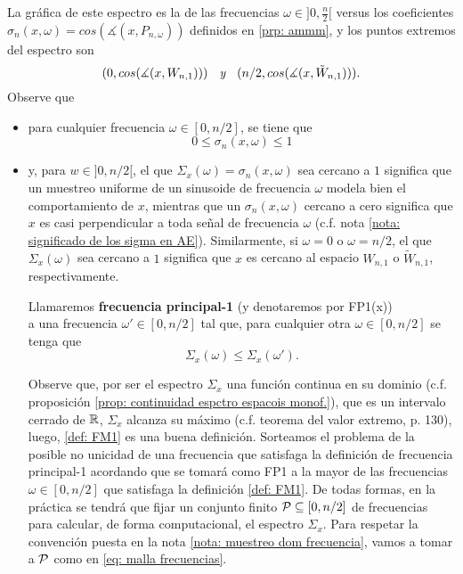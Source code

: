 \begin{itemize}
	La gráfica de este espectro es la de 
	las frecuencias $\omega \in ]0, \frac{n}{2}[$ versus	
	los coeficientes
	$\sigma_{n}(x, \omega) = cos(\measuredangle(x, P_{n, \omega}))$ definidos en 
	\ref{prp: ammm}, y 
	los puntos extremos del espectro son
	\[
	(0, cos(\measuredangle(x, W_{n,1})))
	\hspace{0.2cm} \textit{ y } \hspace{0.2cm}
	(n/2, cos(\measuredangle(x, \tilde{W}_{n,1}))).
	\]	
	Observe que
	\begin{itemize}
		\item para cualquier frecuencia $\omega \in [0, n/2]$, se tiene que
		\[
		0 \leq \sigma_{n}(x, \omega) \leq 1
		\]
		\item 
	y, para $w \in ]0, n/2[$, el que
	$\Sigma_{x}(\omega) = \sigma_{n}(x, \omega)$ sea cercano a $1$ significa que un
	muestreo uniforme de un sinusoide de frecuencia $\omega$
	modela bien el comportamiento de $x$,
	mientras que un $\sigma_{n}(x, \omega)$ cercano
	a cero significa que 
	$x$ es casi perpendicular a toda señal de frecuencia $\omega$
	(c.f. nota \ref{nota: significado de los sigma en AE}).
	Similarmente, si $\omega = 0$ o $\omega = n/2$, el que
	$\Sigma_{x}(\omega)$ sea cercano a $1$ significa que $x$
	es cercano al espacio $W_{n,1}$ o $\tilde{W}_{n,1}$, respectivamente.
	
	\begin{defi}
	\label{def: FM1}
	Llamaremos \textbf{frecuencia principal-1} (y denotaremos por
	FP1(x)) \\
	a una frecuencia $\omega' \in [0, n/2]$ tal que,
	para cualquier otra $\omega \in [0, n/2]$ se tenga que
	\[
	\Sigma_{x}(\omega) \leq \Sigma_{x}(\omega').
	\]
	\end{defi}
	Observe que, por ser el espectro $\Sigma_{x}$ una función continua
	en su dominio (c.f. 
	proposición \ref{prop: continuidad espctro espacois monof.}), 
	que es un intervalo cerrado de $\mathbb{R}$, $\Sigma_{x}$
	alcanza su máximo (c.f. teorema del valor extremo, 
	\cite{spivak} p. 130), luego, \ref{def: FM1} es una buena 
	definición. Sorteamos el problema de la posible no unicidad
	de una frecuencia que satisfaga la definición de frecuencia
	principal-1 acordando que se tomará como FP1
	a la mayor de las frecuencias $\omega \in [0, n/2]$ que satisfaga 
	la definición \ref{def: FM1}.
	De todas formas, 
	en la práctica se tendrá que fijar un conjunto
	finito $\mathcal{P} \subseteq [0, n/2]$ de frecuencias
	para calcular, de forma computacional, el espectro
	$\Sigma_{x}$. Para respetar la convención
	puesta en la nota 
	\ref{nota: muestreo dom frecuencia}, vamos
	a tomar a $\mathcal{P}$ como en 
	\eqref{eq: malla frecuencias}.
	\end{itemize}
\end{itemize}
	

